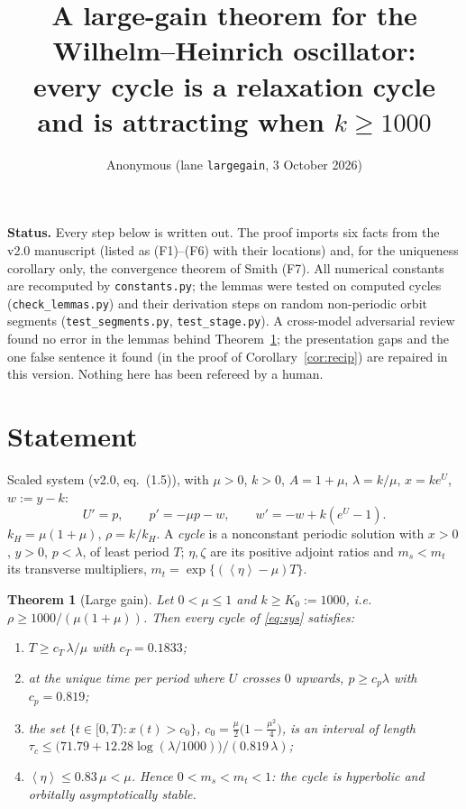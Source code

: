 \documentclass[11pt,a4paper]{article}
\title{A large-gain theorem for the Wilhelm--Heinrich oscillator:\\
every cycle is a relaxation cycle and is attracting when $k\ge 1000$}
\author{Anonymous (lane \texttt{largegain}, 3 October 2026)}
\date{}
\newtheorem{theorem}{Theorem}
\theoremstyle{remark}\newtheorem{remark}[theorem]{Remark}
\newcommand{\avg}[1]{\left\langle #1\right\rangle}
\begin{document}
\maketitle

\noindent\textbf{Status.} Every step below is written out. The proof imports six facts from the v2.0
manuscript (listed as (F1)--(F6) with their locations) and, for the uniqueness corollary only, the
convergence theorem of Smith (F7). All numerical constants are recomputed by
\texttt{constants.py}; the lemmas were tested on computed cycles (\texttt{check\_lemmas.py}) and
their derivation steps on random non-periodic orbit segments (\texttt{test\_segments.py},
\texttt{test\_stage.py}). A cross-model adversarial review found no error in the lemmas behind
Theorem~\ref{thm:main}; the presentation gaps and the one false sentence it found (in the proof of
Corollary~\ref{cor:recip}) are repaired in this version. Nothing here has been refereed by a human.

\section{Statement}
Scaled system (v2.0, eq.\ (1.5)), with $\mu>0$, $k>0$, $A=1+\mu$, $\lambda=k/\mu$, $x=ke^U$,
$w:=y-k$:
\begin{equation}\label{eq:sys}
U'=p,\qquad p'=-\mu p-w,\qquad w'=-w+k(e^U-1).
\end{equation}
$k_H=\mu(1+\mu)$, $\rho=k/k_H$. A \emph{cycle} is a nonconstant periodic solution with $x>0$, $y>0$,
$p<\lambda$, of least period $T$; $\eta,\zeta$ are its positive adjoint ratios and
$m_s<m_t$ its transverse multipliers, $m_t=\exp\{(\avg\eta-\mu)T\}$.

\begin{theorem}[Large gain]\label{thm:main}
Let $0<\mu\le 1$ and $k\ge K_0:=1000$, i.e.\ $\rho\ge 1000/(\mu(1+\mu))$. Then every cycle of
\eqref{eq:sys} satisfies:
\begin{enumerate}[label=\textup{(\roman*)}]
\item $T\ge c_T\,\lambda/\mu$ with $c_T=0.1833$;
\item at the unique time per period where $U$ crosses $0$ upwards, $p\ge c_p\lambda$ with $c_p=0.819$;
\item the set $\{t\in[0,T):x(t)>c_0\}$, $c_0=\tfrac{\mu}{2}\bigl(1-\tfrac{\mu^2}{4}\bigr)$, is an interval of
length $\tau_c\le \bigl(71.79+12.28\log(\lambda/1000)\bigr)/(0.819\,\lambda)$;
\item $\avg\eta\le 0.83\,\mu<\mu$. Hence $0<m_s<m_t<1$: the cycle is hyperbolic and orbitally
asymptotically stable.
\end{enumerate}
\end{theorem}
\end{document}
